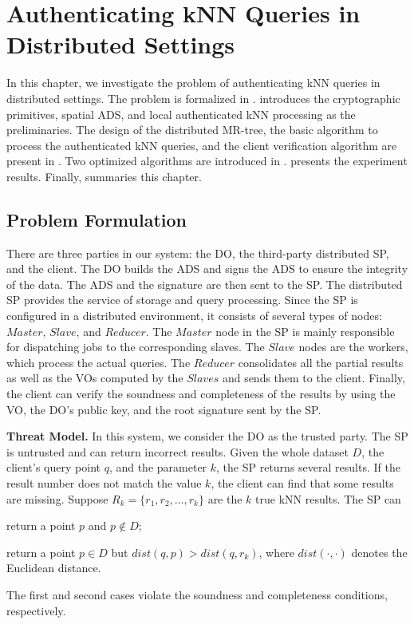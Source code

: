 \chapter{Authenticating {kNN} Queries in Distributed Settings}\label{chap:knn}

In this chapter, we investigate the problem of authenticating {kNN} queries in distributed settings. The problem is formalized in .  introduces the cryptographic primitives, spatial ADS, and local authenticated kNN processing as the preliminaries. The design of the distributed MR-tree, the basic algorithm to process the authenticated kNN queries, and the client verification algorithm are present in . Two optimized algorithms are introduced in .  presents the experiment results. Finally,  summaries this chapter.

\section{Problem Formulation}\label{sec:knn:problem}

There are three parties in our system: the DO, the third-party distributed SP, and the client. The DO builds the ADS and signs the ADS to ensure the integrity of the data. The ADS and the signature are then sent to the SP\@. The distributed SP provides the service of storage and query processing. Since the SP is configured in a distributed environment, it consists of several types of nodes: $Master$, $Slave$, and $Reducer$. The $Master$ node in the SP is mainly responsible for dispatching jobs to the corresponding slaves. The $Slave$ nodes are the workers, which process the actual queries. The $Reducer$ consolidates all the partial results as well as the VOs computed by the $Slaves$ and sends them to the client. Finally, the client can verify the soundness and completeness of the results by using the VO, the DO's public key, and the root signature sent by the SP\@.

\textbf{Threat Model.}
In this system, we consider the DO as the trusted party. The SP is untrusted and can return incorrect results. Given the whole dataset $D$, the client's query point $q$, and the parameter $k$, the SP returns several results. If the result number does not match the value $k$, the client can find that some results are missing. Suppose $R_{k}=\{r_{1},r_{2},\dots,r_{k}\}$ are the $k$ true kNN results. The SP can
\begin{inlineenum}
\item return a point $p$ and $p \notin D$;
\item return a point $p \in D$ but $dist(q,p) > dist(q,r_{k})$, where $dist(\cdot,\cdot)$ denotes the Euclidean distance.
\end{inlineenum}
The first and second cases violate the soundness and completeness conditions, respectively.

